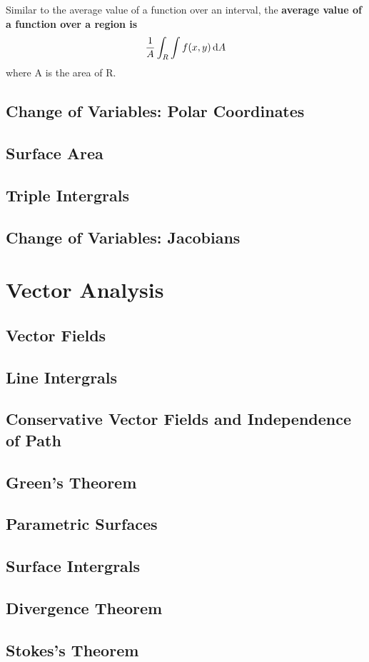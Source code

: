 \documentclass{article}
\begin{document}
Similar to the average value of a function over an interval, the \textbf{average value of a function over a region is}
\[\frac{1}{A} \int_{R} \int f(x,y) \odif{A}\]
where A is the area of R.

\subsection{Change of Variables: Polar Coordinates}
\subsection{Surface Area}
\subsection{Triple Intergrals}
\subsection{Change of Variables: Jacobians}

\section{Vector Analysis}
\subsection{Vector Fields}
\subsection{Line Intergrals}
\subsection{Conservative Vector Fields and Independence of Path}
\subsection{Green's Theorem}
\subsection{Parametric Surfaces}
\subsection{Surface Intergrals}
\subsection{Divergence Theorem}
\subsection{Stokes's Theorem}
\end{document}
